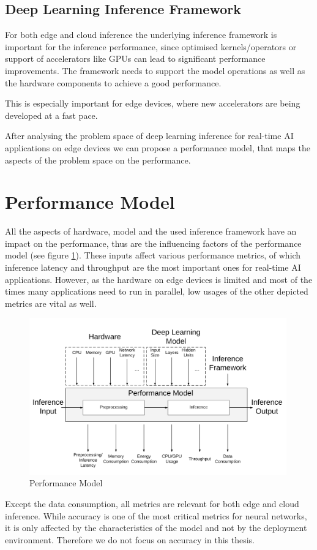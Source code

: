 \subsection{Deep Learning Inference Framework}
For both edge and cloud inference the underlying inference framework is important for the inference performance, since optimised kernels/operators or support of accelerators like GPUs can lead to significant performance improvements.
The framework needs to support the model operations as well as the hardware components to achieve a good performance.


This is especially important for edge devices, where new accelerators are being developed at a fast pace.


After analysing the problem space of deep learning inference for real-time AI applications on edge devices we can propose a performance model, that maps the aspects of the problem space on the performance.



\section{Performance Model}
All the aspects of hardware, model and the used inference framework have an impact on the performance, thus are the influencing factors of the performance model (see figure \ref{fig:perfmodel}). These inputs affect various performance metrics, of which inference latency and throughput are the most important ones for real-time AI applications. However, as the hardware on edge devices is limited and most of the times many applications need to run in parallel, low usages of the other depicted metrics are vital as well.
\begin{figure}[!htb]
\centering
\includegraphics[width=0.99\textwidth]{./Bilder/trade_offs.png}
\caption{Performance Model}
\label{fig:perfmodel}
\end{figure}
Except the data consumption, all metrics are relevant for both edge and cloud inference.
While accuracy is one of the most critical metrics for neural networks, it is only affected by the characteristics of the model and not by the deployment environment. Therefore we do not focus on accuracy in this thesis.

